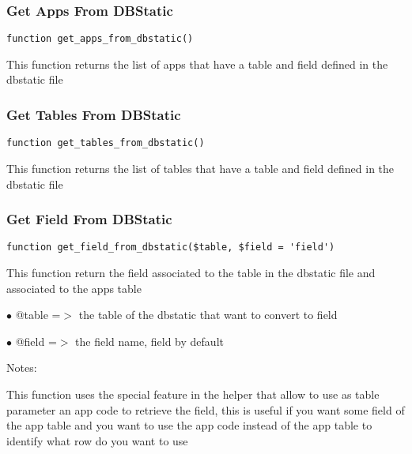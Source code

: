 \documentclass[a4paper]{article}
\begin{document}
\hypertarget{toc425}{}
\subsubsection{Get Apps From DBStatic}

\begin{lstlisting}
function get_apps_from_dbstatic()
\end{lstlisting}

This function returns the list of apps that have a table and field defined
in the dbstatic file

\hypertarget{toc426}{}
\subsubsection{Get Tables From DBStatic}

\begin{lstlisting}
function get_tables_from_dbstatic()
\end{lstlisting}

This function returns the list of tables that have a table and field defined
in the dbstatic file

\hypertarget{toc427}{}
\subsubsection{Get Field From DBStatic}

\begin{lstlisting}
function get_field_from_dbstatic($table, $field = 'field')
\end{lstlisting}

This function return the field associated to the table in the dbstatic
file and associated to the apps table

\begin{compactitem}
\item[\color{myblue}$\bullet$] @table =$>$ the table of the dbstatic that want to convert to field
\item[\color{myblue}$\bullet$] @field =$>$ the field name, field by default
\end{compactitem}

Notes:

This function uses the special feature in the helper that allow to
use as table parameter an app code to retrieve the field, this is
useful if you want some field of the app table and you want to use
the app code instead of the app table to identify what row do you
want to use

\hypertarget{toc428}{}
\end{document}
